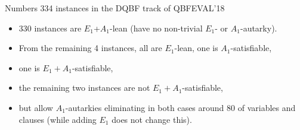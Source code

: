 \documentclass[xcolor=table	]{beamer}
\begin{document}
\begin{frame}{Numbers}
334 instances in the DQBF track of QBFEVAL'18 

\begin{itemize}
    \item 330 instances are $E_1$+$A_1$-lean (have no non-trivial $E_1$- or $A_1$-autarky). 
    \item From the remaining 4 instances, all are $E_1$-lean, one is $A_1$-satisfiable, 
    \item one is $E_1 + A_1$-satisfiable, 
    \item the remaining two instances are not $E_1 + A_1$-satisfiable,
    \item but allow $A_1$-autarkies eliminating in both cases around 80 of variables
and clauses (while adding $E_1$ does not change this).
\end{itemize}

\end{frame}

%  
%  
%   
\end{document}

